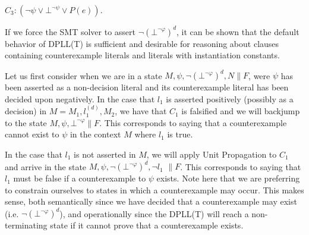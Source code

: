 \documentclass{llncs}
\begin{document}
$C_3 : ( \neg \psi \vee \bot^{\neg \psi} \vee P( e ) )$.

If we force the SMT solver to assert $\neg( \bot^{\neg \varphi} )^d$, it can be shown that the default behavior of DPLL(T) is sufficient and desirable for reasoning about clauses containing counterexample literals and literals with instantiation constants.

Let us first consider when we are in a state $M, \psi, \neg( \bot^{\neg \varphi} )^d, N \parallel F$, were $\psi$ has been asserted as a non-decision literal and its counterexample literal has been decided upon negatively.
In the case that $l_1$ is asserted positively (possibly as a decision) in $M = M_1, l^{(d)}_1, M_2$, we have that $C_1$ is falsified and we will backjump to the state $M, \psi, \bot^{\neg \varphi} \parallel F$.
This corresponds to saying that a counterexample cannot exist to $\psi$ in the context $M$ where $l_1$ is true.

In the case that $l_1$ is not asserted in $M$, we will apply Unit Propagation to $C_1$ and arrive in the state $M, \psi, \neg( \bot^{\neg \varphi} )^d, \neg l_1$ $\parallel F$.
This corresponds to saying that $l_1$ must be false if a counterexample to $\psi$ exists.
Note here that we are preferring to constrain ourselves to states in which a counterexample may occur.
This makes sense, both semantically since we have decided that a counterexample may exist (i.e. $\neg( \bot^{\neg \varphi} )^d$), and operationally since the DPLL(T) will reach a non-terminating state if it cannot prove that a counterexample exists.



\end{document}
